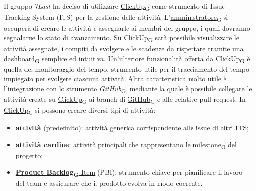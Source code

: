 Il gruppo \textit{7Last} ha deciso di utilizzare \href{https://7last.github.io/docs/rtb/documentazione-interna/glossario\#clickup}{ClickUp\textsubscript{G}} come strumento di Issue Tracking System (ITS) per la gestione delle attività. L'\href{https://7last.github.io/docs/rtb/documentazione-interna/glossario\#amministratore}{amministratore\textsubscript{G}} si occuperà di creare le attività e assegnarle ai membri del gruppo, i quali dovranno segnalarne lo stato di avanzamento. Su \href{https://7last.github.io/docs/rtb/documentazione-interna/glossario\#clickup}{ClickUp\textsubscript{G}} sarà possibile visualizzare le attività assegnate, i compiti da svolgere e le scadenze da rispettare tramite una \href{https://7last.github.io/docs/rtb/documentazione-interna/glossario\#dashboard}{dashboard\textsubscript{G}} semplice ed intuitiva. Un'ulteriore funzionalità offerta da \href{https://7last.github.io/docs/rtb/documentazione-interna/glossario\#clickup}{ClickUp\textsubscript{G}} è quella del monitoraggio del tempo, strumento utile per il tracciamento del tempo impiegato per svolgere ciascuna attività. Altra caratteristica molto utile è l'integrazione con lo strumento \href{https://7last.github.io/docs/rtb/documentazione-interna/glossario\#github}{\textit{GitHub}\textsubscript{G}}, mediante la quale è possibile collegare le attività create su \href{https://7last.github.io/docs/rtb/documentazione-interna/glossario\#clickup}{ClickUp\textsubscript{G}} ai branch di \href{https://7last.github.io/docs/rtb/documentazione-interna/glossario\#github}{GitHub\textsubscript{G}} e alle relative pull request.
In \href{https://7last.github.io/docs/rtb/documentazione-interna/glossario\#clickup}{ClickUp\textsubscript{G}} si possono creare diversi tipi di attività:
\begin{itemize}
    \item \textbf{attività} (predefinito): attività generica corrispondente alle issue di altri ITS;
    \item \textbf{attività cardine}: attività principali che rappresentano le \href{https://7last.github.io/docs/rtb/documentazione-interna/glossario\#milestone}{milestone\textsubscript{G}} del progetto;
    \item \href{https://7last.github.io/docs/rtb/documentazione-interna/glossario\#product-backlog}{\textbf{Product Backlog\textsubscript{G} }Item} (PBI): strumento chiave per pianificare il lavoro del team e assicurare che il prodotto evolva in modo coerente.
\end{itemize}
